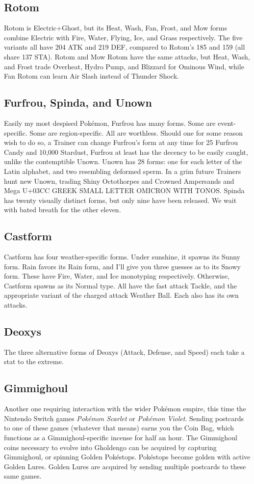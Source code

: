 \subsection{Rotom}
Rotom is Electric+Ghost, but its Heat, Wash, Fan, Frost, and Mow forms
 combine Electric with Fire, Water, Flying, Ice, and Grass respectively.
The five variants all have 204 ATK and 219 DEF, compared to Rotom's
 185 and 159 (all share 137 STA).
Rotom and Mow Rotom have the same attacks, but Heat, Wash, and Frost
  trade Overheat, Hydro Pump, and Blizzard for Ominous Wind,
  while Fan Rotom can learn Air Slash instead of Thunder Shock.

\subsection{Furfrou, Spinda, and Unown\label{subsec:furfrou}}
Easily my most despised Pokémon, Furfrou has many forms.
Some are event-specific.
Some are region-specific.
All are worthless.
Should one for some reason wish to do so, a Trainer can change Furfrou's form
  at any time for 25 Furfrou Candy and 10,000 Stardust,
Furfrou at least has the decency to be easily caught, unlike the contemptible Unown.
Unown has 28 forms: one for each letter of the Latin alphabet, and two
  resembling deformed sperm.
In a grim future Trainers hunt new Unown, trading Shiny Octothorpes and
  Crowned Ampersands and Mega U+03CC GREEK SMALL LETTER OMICRON WITH TONOS.
Spinda has twenty visually distinct forms, but only nine have been released.
We wait with bated breath for the other eleven.

\subsection{Castform}
Castform has four weather-specific forms.
Under sunshine, it spawns its Sunny form.
Rain favors its Rain form, and I'll give you three guesses as to its Snowy form.
These have Fire, Water, and Ice monotyping respectively.
Otherwise, Castform spawns as its Normal type.
All have the fast attack Tackle, and the appropriate variant of the charged attack Weather Ball.
Each also has its own attacks.

\subsection{Deoxys}
The three alternative forms of Deoxys (Attack, Defense, and Speed) each take a stat to the extreme.

\subsection{Gimmighoul\label{sec:gimmighoul}}
Another one requiring interaction with the wider Pokémon empire, this time
 the Nintendo Switch games \textit{Pokémon Scarlet} or \textit{Pokémon Violet}.
Sending postcards to one of these games (whatever that means) earns you the Coin Bag,
 which functions as a Gimmighoul-specific incense for half an hour.
The Gimmighoul coins necessary to evolve into Gholdengo can be acquired by capturing
 Gimmighoul, or spinning Golden Pokéstops.
Pokéstops become golden with active Golden Lures.
Golden Lures are acquired by sending multiple postcards to these same games.

